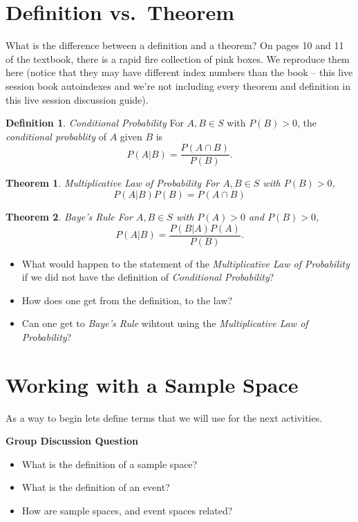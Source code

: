 \documentclass[
]{book}
\providecommand{\tightlist}{%
  \setlength{\itemsep}{0pt}\setlength{\parskip}{0pt}}
\newtheorem{theorem}{Theorem}[chapter]
\theoremstyle{definition}
\newtheorem{definition}{Definition}[chapter]
\theoremstyle{definition}
\theoremstyle{definition}
\theoremstyle{definition}
\theoremstyle{remark}
\begin{document}
\section{Definition vs.~Theorem}\label{definition-vs.-theorem}

What is the difference between a definition and a theorem? On pages 10 and 11 of the textbook, there is a rapid fire collection of pink boxes. We reproduce them here (notice that they may have different index numbers than the book -- this live session book autoindexes and we're not including every theorem and definition in this live session discussion guide).

\begin{definition}
\emph{Conditional Probability} For \(A, B \in S\) with \(P(B) > 0\), the \emph{conditional probablity} of \(A\) given \(B\) is \[P(A|B) = \frac{P(A\cap B)}{P(B)}.\]
\end{definition}

\begin{theorem}
\emph{Multiplicative Law of Probability} For \(A, B \in S\) with \(P(B) > 0\), \[P(A|B)P(B) = P(A \cap B)\]
\end{theorem}

\begin{theorem}
\emph{Baye's Rule} For \(A, B \in S\) with \(P(A) > 0\) and \(P(B) > 0\), \[P(A|B) = \frac{P(B|A)P(A)}{P(B)}.\]
\end{theorem}

\begin{itemize}
\tightlist
\item
  What would happen to the statement of the \emph{Multiplicative Law of Probability} if we did not have the definition of \emph{Conditional Probability}?
\item
  How does one get from the definition, to the law?
\item
  Can one get to \emph{Baye's Rule} wihtout using the \emph{Multiplicative Law of Probability}?
\end{itemize}

\section{Working with a Sample Space}\label{working-with-a-sample-space}

As a way to begin lets define terms that we will use for the next activities.

\textbf{Group Discussion Question}

\begin{itemize}
\tightlist
\item
  What is the definition of a sample space?
\item
  What is the definition of an event?
\item
  How are sample spaces, and event spaces related?
\end{itemize}
\end{document}
